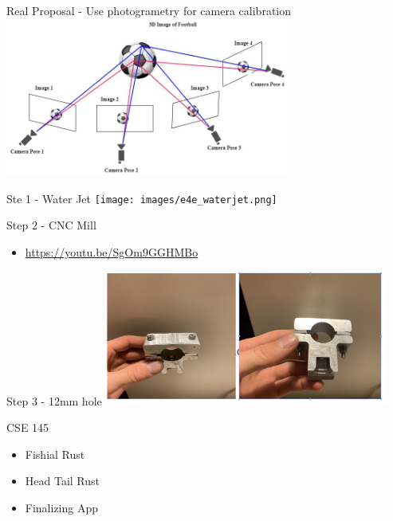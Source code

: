 \begin{frame}{Real Proposal - Use photogrametry for camera calibration}
    \centering
    \includegraphics[height=0.7\textheight,width=0.7\textwidth,keepaspectratio]{images/fishsense-photogrametry.jpg}
\end{frame}

\begin{frame}{Ste 1 - Water Jet}
    \centering
    \texttt{[image: images/e4e\_waterjet.png]}
\end{frame}

\begin{frame}{Step 2 - CNC Mill}
    \begin{itemize}
        \item{\url{https://youtu.be/SgOm9GGHMBo}}
    \end{itemize}
\end{frame}

\begin{frame}{Step 3 - 12mm hole}
    \centering
    \includegraphics[height=0.7\textheight,width=0.7\textwidth,keepaspectratio]{images/Al_mount2.png}
\end{frame}

\begin{frame}{CSE 145}
    \begin{itemize}
        \item Fishial Rust
        \item Head Tail Rust
        \item Finalizing App
    \end{itemize}
\end{frame}

